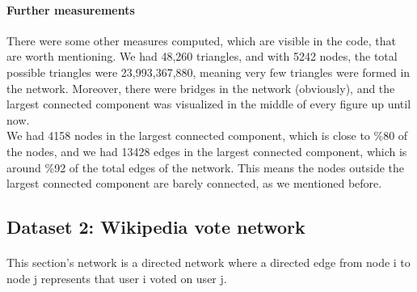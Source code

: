 \documentclass[letterpaper, 11pt]{article}
\newcommand{\1}{\mathds{1}}	%
\theoremstyle{definition}
\begin{document}
\paragraph{Further measurements}There were some other measures computed, which are visible in the code, that are worth mentioning. We had 48,260 triangles, and with 5242 nodes, the total possible triangles were 23,993,367,880, meaning very few triangles were formed in the network. Moreover, there were bridges in the network (obviously), and the largest connected component was visualized in the middle of every figure up until now. \\
We had 4158 nodes in the largest connected component, which is close to \%80 of the nodes, and we had 13428 edges in the largest connected component, which is around \%92 of the total edges of the network. This means the nodes outside the largest connected component are barely connected, as we mentioned before.
\newpage
\subsection*{Dataset 2: Wikipedia vote network}
\paragraph{}This section's network is a directed network where a directed edge from node i to node j represents that user i voted on user j.
\end{document}

